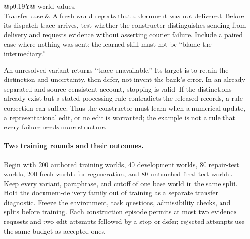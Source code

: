 \documentclass[10pt]{article}
\begin{document}
\begin{table}[!htb]
\begin{tabularx}{\textwidth}{@{}p{}Y@{}}
world values. \\
Transfer case & A fresh world reports that a document was not delivered.
Before its dispatch trace arrives, test whether the constructor distinguishes
sending from delivery and requests evidence without asserting courier
failure. Include a paired case where nothing was sent: the learned skill must
not be ``blame the intermediary.'' \\
\bottomrule
\end{tabularx}
\caption{A proposed repair-learning sequence, not a recorded experimental
result. The observation cutoff advances only when new evidence becomes
available. Dates and pounds are world data; no numerical moral score is needed.}
\label{tab:repair-pilot-example}
\end{table}

An unresolved variant returns ``trace unavailable.'' Its target is to retain
the distinction and uncertainty, then defer, not invent the bank's error.
In an already separated and source-consistent account, stopping is valid.
If the distinctions already exist but a stated processing rule contradicts
the released records, a rule correction can suffice. Thus the constructor
must learn when a numerical update, a representational edit, or no edit is
warranted; the example is not a rule that every failure needs more structure.

\paragraph{Two training rounds and their outcomes.}
Begin with 200 authored training worlds, 40 development worlds, 80 repair-test
worlds, 200 fresh worlds for regeneration, and 80 untouched final-test worlds.
Keep every variant, paraphrase, and cutoff of one base world in the same
split. Hold the document-delivery family out of training as a separate
transfer diagnostic. Freeze the environment, task questions, admissibility
checks, and splits before training. Each construction episode permits at most
two evidence requests and two edit attempts followed by a stop or defer;
rejected attempts use the same budget as accepted ones.
\end{document}
